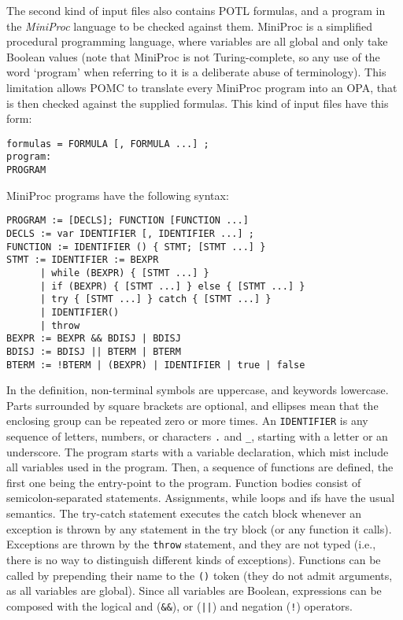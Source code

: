 \documentclass{article}
\begin{document}
The second kind of input files also contains POTL formulas,
and a program in the \emph{MiniProc} language to be checked against them.
MiniProc is a simplified procedural programming language, where variables are all global
and only take Boolean values (note that MiniProc is not Turing-complete,
so any use of the word `program' when referring to it is a deliberate abuse of terminology).
This limitation allows POMC to translate every MiniProc program into an OPA,
that is then checked against the supplied formulas.
This kind of input files have this form:
\begin{verbatim}
formulas = FORMULA [, FORMULA ...] ;
program:
PROGRAM
\end{verbatim}
MiniProc programs have the following syntax:
\begin{verbatim}
PROGRAM := [DECLS]; FUNCTION [FUNCTION ...]
DECLS := var IDENTIFIER [, IDENTIFIER ...] ;
FUNCTION := IDENTIFIER () { STMT; [STMT ...] }
STMT := IDENTIFIER := BEXPR
      | while (BEXPR) { [STMT ...] }
      | if (BEXPR) { [STMT ...] } else { [STMT ...] }
      | try { [STMT ...] } catch { [STMT ...] }
      | IDENTIFIER()
      | throw
BEXPR := BEXPR && BDISJ | BDISJ
BDISJ := BDISJ || BTERM | BTERM
BTERM := !BTERM | (BEXPR) | IDENTIFIER | true | false
\end{verbatim}
In the definition, non-terminal symbols are uppercase, and keywords lowercase.
Parts surrounded by square brackets are optional, and ellipses mean that the enclosing
group can be repeated zero or more times.
An \texttt{IDENTIFIER} is any sequence of letters, numbers, or characters \texttt{.} and \texttt{\_},
starting with a letter or an underscore.
The program starts with a variable declaration, which mist include all variables used in the program.
Then, a sequence of functions are defined, the first one being the entry-point to the program.
Function bodies consist of semicolon-separated statements.
Assignments, while loops and ifs have the usual semantics.
The try-catch statement executes the catch block whenever an exception is thrown by any statement
in the try block (or any function it calls).
Exceptions are thrown by the \texttt{throw} statement, and they are not typed
(i.e., there is no way to distinguish different kinds of exceptions).
Functions can be called by prepending their name to the \texttt{()} token
(they do not admit arguments, as all variables are global).
Since all variables are Boolean, expressions can be composed with the logical and (\texttt{\&\&}),
or (\texttt{||}) and negation (\texttt{!}) operators.
\end{document}
